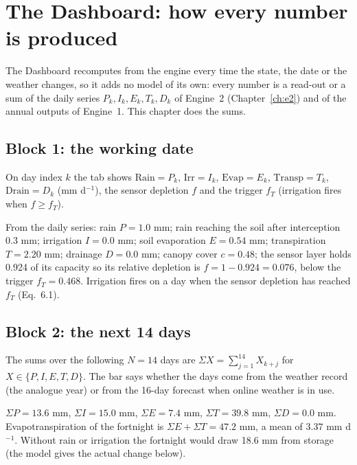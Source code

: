 \chapter{The Dashboard: how every number is produced}\label{ch:dash}

The Dashboard recomputes from the engine every time the state, the date or the weather changes, so it adds no model of its own: every number is a read-out or a sum of the daily series $P_k,I_k,E_k,T_k,D_k$ of Engine~2 (Chapter~\ref{ch:e2}) and of the annual outputs of Engine~1. This chapter does the sums.

\section{Block 1: the working date}
On day index $k$ the tab shows $\mathrm{Rain}=P_k$, $\mathrm{Irr}=I_k$, $\mathrm{Evap}=E_k$, $\mathrm{Transp}=T_k$, $\mathrm{Drain}=D_k$ (mm d$^{-1}$), the sensor depletion $f$ and the trigger $f_T$ (irrigation fires when $f\ge f_T$).

\sol  From the daily series: rain $P=1.0$ mm; rain reaching the soil after interception $0.3$ mm; irrigation $I=0.0$ mm; soil evaporation $E=0.54$ mm; transpiration $T=2.20$ mm; drainage $D=0.0$ mm; canopy cover $c=0.48$; the sensor layer holds 0.924 of its capacity so its relative depletion is $f=1-0.924=0.076$, below the trigger $f_T=0.468$. Irrigation fires on a day when the sensor depletion has reached $f_T$ (Eq.~6.1).


\section{Block 2: the next 14 days}
The sums over the following $N=14$ days are $\Sigma X=\sum_{j=1}^{14}X_{k+j}$ for $X\in\{P,I,E,T,D\}$. The bar says whether the days come from the weather record (the analogue year) or from the 16-day forecast when online weather is in use.

\sol  $\Sigma P=13.6$ mm, $\Sigma I=15.0$ mm, $\Sigma E=7.4$ mm, $\Sigma T=39.8$ mm, $\Sigma D=0.0$ mm. Evapotranspiration of the fortnight is $\Sigma E+\Sigma T=47.2$ mm, a mean of $3.37$ mm d$^{-1}$. Without rain or irrigation the fortnight would draw 18.6 mm from storage (the model gives the actual change below).



